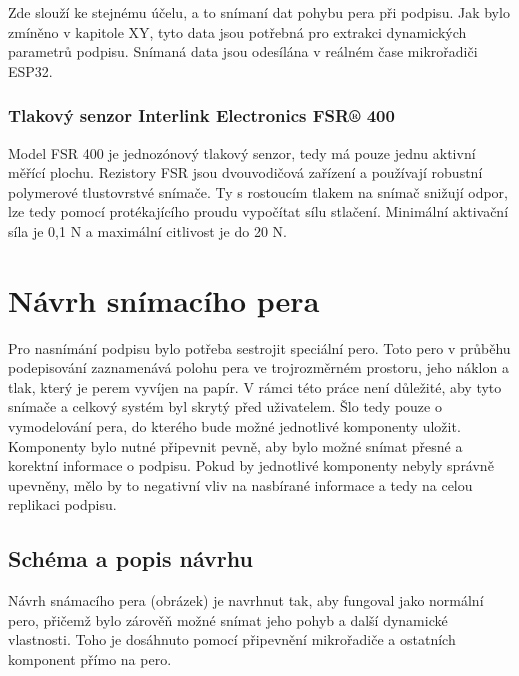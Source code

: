 Zde slouží ke stejnému účelu, a to snímaní dat pohybu pera při podpisu.                             %
Jak bylo zmíněno v kapitole XY, tyto data jsou potřebná pro extrakci dynamických parametrů podpisu. %
Snímaná data jsou odesílána v reálném čase mikrořadiči ESP32.                                       %

\subsection*{Tlakový senzor Interlink Electronics FSR® 400}
Model FSR 400 je jednozónový tlakový senzor, tedy má pouze jednu aktivní měřící plochu.                       %
Rezistory FSR jsou dvouvodičová zařízení a používají robustní polymerové tlustovrstvé snímače.                %
Ty s rostoucím tlakem na snímač snižují odpor, lze tedy pomocí protékajícího proudu vypočítat sílu stlačení.  %
Minimální aktivační síla je 0,1 N a maximální citlivost je do 20 N.                                           %


\chapter{Návrh snímacího pera}
Pro nasnímání podpisu bylo potřeba sestrojit speciální pero.                                        %
Toto pero v průběhu podepisování zaznamenává polohu pera ve trojrozměrném prostoru,                 %
jeho náklon a tlak, který je perem vyvíjen na papír.                                                %
V rámci této práce není důležité, aby tyto snímače a celkový systém byl skrytý před uživatelem.     %
Šlo tedy pouze o vymodelování pera, do kterého bude možné jednotlivé komponenty uložit.             %
Komponenty bylo nutné připevnit pevně, aby bylo možné snímat přesné a korektní informace o podpisu. %
Pokud by jednotlivé komponenty nebyly správně upevněny,                                             %
mělo by to negativní vliv na nasbírané informace a tedy na celou replikaci podpisu.                 %
 
\section{Schéma a popis návrhu}
Návrh snámacího pera (obrázek) je navrhnut tak, aby fungoval jako normální pero, 
přičemž bylo zárověň možné snímat jeho pohyb a další dynamické vlastnosti.
Toho je dosáhnuto pomocí připevnění mikrořadiče a ostatních komponent přímo na pero.

